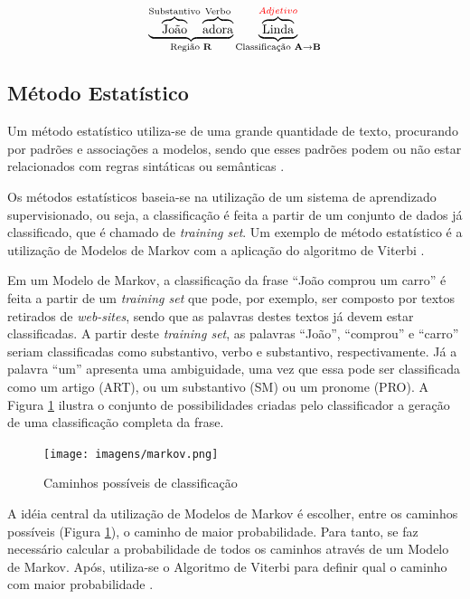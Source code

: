 \begin{itemize}
  \[\underbrace{\overbrace{\text{João}}^\text{Substantivo}
  \overbrace{\text{adora}}^\text{Verbo}}_\text{Região \textbf{R}}
  \underbrace{\overbrace{\text{L}\text{inda}}^{\textcolor{red}{Adjetivo}}}_\text{Classificação
  \textbf{A}\textrightarrow\textbf{B}}
  \]
  
  
\end{itemize}

\subsection{Método Estatístico}
Um método estatístico utiliza-se de uma grande
quantidade de texto, procurando por padrões e
associações a modelos, sendo que esses padrões podem ou não estar relacionados
com regras sintáticas ou semânticas \cite{manningschutze1999}.

Os métodos estatísticos baseia-se na utilização de um sistema de aprendizado
supervisionado, ou seja, a classificação é feita a partir de um conjunto de dados já
classificado, que é chamado de \textit{training set}. Um exemplo de método
estatístico é a utilização de Modelos de Markov com a aplicação do algoritmo de
Viterbi \cite{manningschutze1999}.

Em um Modelo de Markov, a classificação da frase ``João comprou um
carro'' é feita a partir de um \textit{training set} que pode, por exemplo, ser
composto por textos retirados de \textit{web-sites}, sendo que as palavras
destes textos já devem estar classificadas. A partir deste \textit{training
set}, as palavras ``João'', ``comprou'' e ``carro'' seriam classificadas como
substantivo, verbo e substantivo, respectivamente. Já a palavra ``um'' apresenta
uma ambiguidade, uma vez que essa pode ser classificada como um artigo (ART), ou
um substantivo (SM) ou um pronome (PRO).
A Figura \ref{fig:markov} ilustra o conjunto de possibilidades criadas pelo
classificador a geração de uma classificação completa da frase.

\begin{figure}[htbp]
\centering
\texttt{[image: imagens/markov.png]}
\caption{Caminhos possíveis de classificação}
\label{fig:markov}
\end{figure}

A idéia central da utilização de Modelos de Markov é
escolher, entre os caminhos possíveis (Figura \ref{fig:markov}), o caminho
de maior probabilidade. Para tanto, se faz necessário calcular a probabilidade de todos
os caminhos através de um Modelo de Markov. Após, utiliza-se o
Algoritmo de Viterbi para definir qual o caminho com maior probabilidade
\cite{manningschutze1999}.

